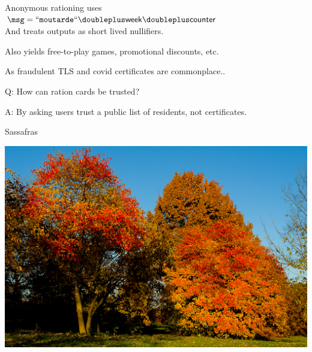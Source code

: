 \documentclass{beamer}
\begin{document}
\begin{frame}

Anonymous rationing uses $\msg = \mathtt{``moutarde``} \doubleplus \mathsf{week} \doubleplus \mathsf{counter}$ \\
\hspace{1pt} And treats outputs as short lived nullifiers.

\bigskip\bigskip 

Also yields free-to-play games, promotional discounts, etc.

\end{frame}



\begin{frame}

As fraudulent TLS and covid certificates are commonplace..

\bigskip

Q: How can ration cards be trusted?

\bigskip 

A: By asking users trust a public list of residents, not certificates.


\end{frame}



\begin{frame}{Sassafras}

\includegraphics[width=\textwidth]{../images/Sassafras-albidum.jpg}

\end{frame}
\end{document}
